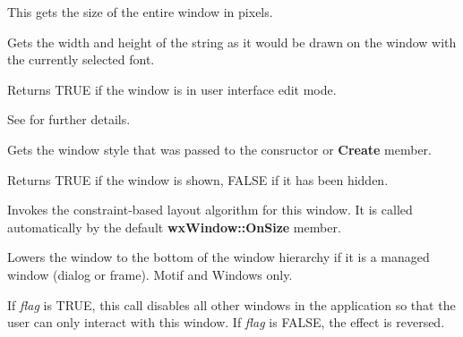 
This gets the size of the entire window in pixels.



Gets the width and height of the string as it would be drawn on the
window with the currently selected font.

\label{getusereditmode}


Returns TRUE if the window is in user interface edit mode.

See  for
further details.



Gets the window style that was passed to the consructor or {\bf Create}
member.



Returns TRUE if the window is shown, FALSE if it has been hidden.

\label{wxwindowlayout}


Invokes the constraint-based layout algorithm for this window. It is called
automatically by the default {\bf wxWindow::OnSize} member.



Lowers the window to the bottom of the window hierarchy if it is a managed window (dialog
or frame). Motif and Windows only.



If {\it flag} is TRUE, this call disables all other windows in the application so that
the user can only interact with this window. If {\it flag} is FALSE, the effect is reversed.


